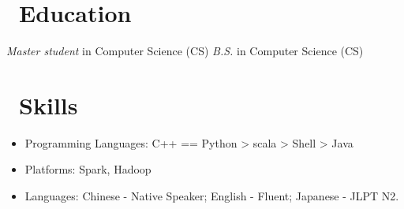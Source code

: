 \documentclass[13pt,a4paper]{resume}
\begin{document}



\section{\faGraduationCap\ Education}
\textit{Master student} in Computer Science (CS)
\textit{B.S.} in Computer Science (CS)

\section{\faCogs\ Skills}
\begin{itemize}[parsep=0.5ex]
  \item Programming Languages:  C++ == Python > scala > Shell > Java
  \item Platforms: Spark, Hadoop
  \item Languages: Chinese - Native Speaker; English - Fluent; Japanese - JLPT N2.
\end{itemize}
\end{document}
